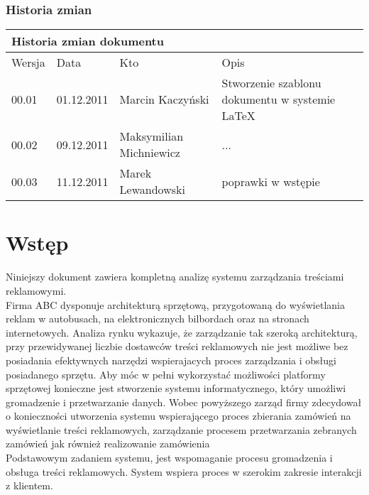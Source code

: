 \documentclass[10pt,a4paper,titlepage]{article} %
\begin{document}
	\subsubsection*{Historia zmian}
		\begin{table}[h]
		\begin{tabular}{|m{1cm}|m{2cm}|m{3.5cm}|m{6.5cm}|}
			\hline
			\multicolumn{4}{|l|}{Historia zmian dokumentu} \\
			\hline
			\hline Wersja  & Data & Kto & Opis  \\ 
			\hline 00.01 & 01.12.2011 & Marcin Kaczyński & Stworzenie szablonu dokumentu w systemie \LaTeX \\ 
			\hline 00.02 & 09.12.2011 & Maksymilian Michniewicz & ... \\ 
			\hline 00.03 & 11.12.2011 & Marek Lewandowski & poprawki w wstępie \\ 
			\hline 
		\end{tabular} 
		\end{table}
	\newpage

	
	\tableofcontents
	\newpage
	

	\section{Wstęp}

		Niniejszy dokument zawiera kompletną analizę systemu zarządzania treściami
		reklamowymi.\\ 
		
		Firma ABC dysponuje architekturą sprzętową, przygotowaną do wyświetlania
		reklam w autobusach, na elektronicznych bilbordach oraz na stronach
		internetowych. Analiza rynku wykazuje, że zarządzanie tak szeroką architekturą,
		przy przewidywanej liczbie dostawców treści reklamowych nie jest możliwe
		bez posiadania efektywnych narzędzi wspierajacych proces zarządzania i obsługi
		posiadanego sprzętu. Aby móc w pełni wykorzystać możliwości platformy sprzętowej
		konieczne jest stworzenie systemu informatycznego, który umożliwi gromadzenie i 
		przetwarzanie danych. Wobec powyższego zarząd firmy zdecydował o konieczności
		utworzenia systemu wspierającego proces zbierania zamówień na wyświetlanie
		treści reklamowych, zarządzanie procesem przetwarzania zebranych zamówień jak 
		również realizowanie zamówienia\\
		
		Podstawowym zadaniem systemu, jest wspomaganie procesu gromadzenia i obsługa
		treści reklamowych. System wspiera proces w szerokim zakresie interakcji z
		klientem.\\
		
\end{document}

